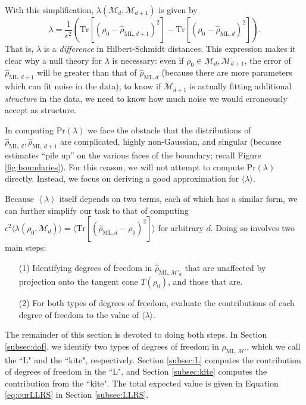 \documentclass[aps,pra, twocolumn]{revtex4-1}
\newcommand{\M}{\mathcal{M}}
\newcommand{\expect}[1]{\ensuremath{\left\langle#1\right\rangle}}
\newcommand{\rhohat}{\hat{\rho}}
\newcommand{\rhoML}[1]{\rhohat_{\scriptscriptstyle{\mathrm{ML},#1}}}
\begin{document}
With this simplification, $\lambda(\M_{d},\M_{d+1})$ is given by
\begin{equation}
\lambda = \frac{1}{\epsilon^{2}}\left(\mathrm{Tr}[(\rho_{0} - \rhoML{d+1})^{2}] -  \mathrm{Tr}[(\rho_{0} - \rhoML{d})^{2}]\right).
\end{equation}
That is, $\lambda$ is a \emph{difference} in Hilbert-Schmidt distances. This expression makes it clear why a null theory for $\lambda$ is necessary: even if $\rho_{0} \in \M_{d},\M_{d+1}$, the error of $\rhoML{d+1}$ will be greater than that of $\rhoML{d}$ (because there are more parameters which can fit noise in the data); to know if $\M_{d+1}$ is actually fitting additional \emph{structure} in the data, we need to know how much noise we would erroneously accept as structure.

In computing $\mathrm{Pr}(\lambda)$ we face the obstacle that the distributions of $\rhoML{d}, \rhoML{d+1}$ are complicated, highly non-Gaussian, and singular (because estimates ``pile up'' on the various faces of the boundary; recall Figure \ref{fig:boundaries}).  For this reason, we will not attempt to compute $\mathrm{Pr}(\lambda)$ directly.  Instead, we focus on deriving a good approximation for $\langle \lambda \rangle$.

Because $\expect{\lambda}$ itself depends on two terms, each of which has a similar form, we can further simplify our task to that of computing $\epsilon^{2}\langle \lambda(\rho_{0}, \M_{d}) \rangle = \langle \mathrm{Tr}[(\rhoML{d}  - \rho_{0})^{2}] \rangle$ for arbitrary $d$.
Doing so involves two main steps:
\begin{itemize}
\item[(1)] Identifying degrees of freedom in $\rhoML{\M'_{d}}$ that are unaffected by projection onto the tangent cone $T(\rho_{0})$, and those that are.
\item[(2)] For both types of degrees of freedom, evaluate the contributions of each degree of freedom to the value of $\langle \lambda \rangle$.
\end{itemize}

The remainder of this section is devoted to doing both steps. In Section \ref{subsec:dof}, we identify two types of degrees of freedom in $\rhoML{\M'}$, which we call the ``L" and the ``kite", respectively. Section \ref{subsec:L} computes the contribution of degrees of freedom in the ``L", and Section \ref{subsec:kite} computes the contribution from the ``kite". The total expected value is given in Equation \eqref{eq:ourLLRS} in Section \ref{subsec:LLRS}.
\end{document}
